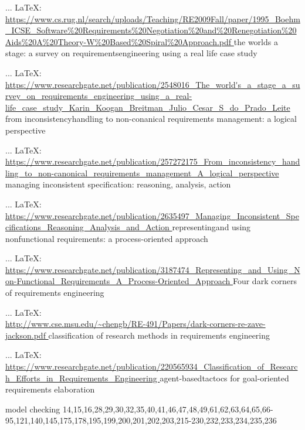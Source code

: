  ... \LaTeX:\\ \url{https://www.cs.rug.nl/search/uploads/Teaching/RE2009Fall/paper/1995_Boehm_ICSE_Software%20Requirements%20Negotiation%20and%20Renegotiation%20Aids%20A%20Theory-W%20Based%20Spiral%20Approach.pdf }
the worlds a stage: a survey on requirementsengineering using a real life case study

 ... \LaTeX:\\ \url{https://www.researchgate.net/publication/2548016_The_world's_a_stage_a_survey_on_requirements_engineering_using_a_real-life_case_study_Karin_Koogan_Breitman_Julio_Cesar_S_do_Prado_Leite }
from inconsistencyhandling to non-conanical requirements management: a logical perspective

 ... \LaTeX:\\ \url{https://www.researchgate.net/publication/257272175_From_inconsistency_handling_to_non-canonical_requirements_management_A_logical_perspective }
managing inconsistent specification: reasoning, analysis, action

 ... \LaTeX:\\ \url{https://www.researchgate.net/publication/2635497_Managing_Inconsistent_Specifications_Reasoning_Analysis_and_Action  }
representingand using nonfunctional requirements: a process-oriented approach

 ... \LaTeX:\\ \url{https://www.researchgate.net/publication/3187474_Representing_and_Using_Non-Functional_Requirements_A_Process-Oriented_Approach }
Four dark corners of requirements engineering

 ... \LaTeX:\\ \url{ http://www.cse.msu.edu/~chengb/RE-491/Papers/dark-corners-re-zave-jackson.pdf }
classification of research methods in requirements engineering

 ... \LaTeX:\\ \url{https://www.researchgate.net/publication/220565934_Classification_of_Research_Efforts_in_Requirements_Engineering }
agent-basedtactocs for goal-oriented requirements elaboration





model checking 
14,15,16,28,29,30,32,35,40,41,46,47,48,49,61,62,63,64,65,66-95,121,140,145,175,178,195,199,200,201,202,203,215-230,232,233,234,235,236



